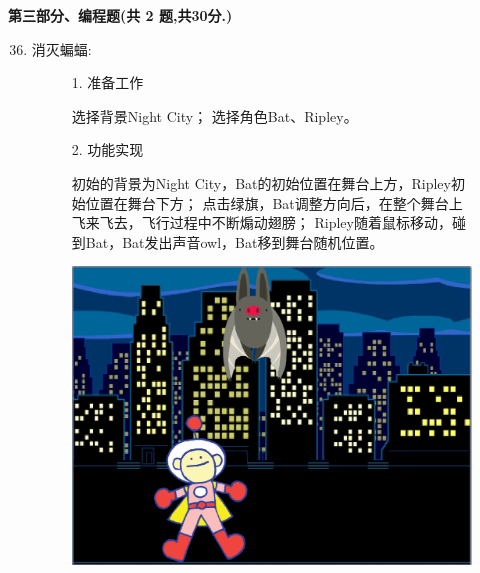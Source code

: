\documentclass[10pt, a4paper]{article}
\begin{document}
    {\noindent \textbf{第三部分、编程题(共 2 题,共30分.)}}
    \begin{enumerate}
        \setcounter{enumi}{35}
        
        \item 消灭蝙蝠:
        \begin{figure}[htbp]
            \centering
            \begin{minipage}{.6\textwidth}
                1. 准备工作
                \begin{tasks}[label = (\arabic*)]
                    \task 选择背景Night City；
                    \task 选择角色Bat、Ripley。
                \end{tasks}
                2. 功能实现
                \begin{tasks}[label = (\arabic*)]
                    \task 初始的背景为Night City，Bat的初始位置在舞台上方，Ripley初始位置在舞台下方；
                    \task 点击绿旗，Bat调整方向后，在整个舞台上飞来飞去，飞行过程中不断煽动翅膀；
                    \task Ripley随着鼠标移动，碰到Bat，Bat发出声音owl，Bat移到舞台随机位置。
                \end{tasks}
            \end{minipage}
            \begin{minipage}{.3\textwidth}
                \centering
                \includegraphics[width=\textwidth]{36.png}
            \end{minipage}
        \end{figure}


\end{enumerate}
\end{document}
